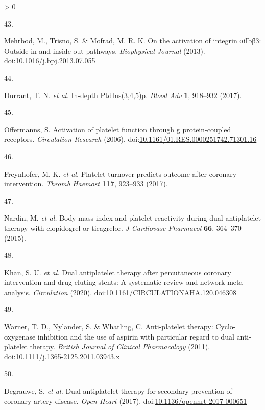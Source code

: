 \documentclass[11pt,twoside]{bristolthesis}
\newlength{\cslhangindent}
\newlength{\csllabelwidth}
\newenvironment{CSLReferences}[2] %
 {%
  \setlength{\parindent}{0pt}
  \ifodd #1 \everypar{\setlength{\hangindent}{\cslhangindent}}\ignorespaces\fi
  \ifnum #2 > 0
  \setlength{\parskip}{#2\baselineskip}
  \fi
 }%
 {}
\newcommand{\CSLLeftMargin}[1]{\parbox[t]{\csllabelwidth}{#1}}
\newcommand{\CSLRightInline}[1]{\parbox[t]{\linewidth - \csllabelwidth}{#1}\break}
\begin{document}
\begin{CSLReferences}{0}{0}
\leavevmode\hypertarget{ref-Mehrbod2013}{}%
\CSLLeftMargin{43. }
\CSLRightInline{Mehrbod, M., Trisno, S. \& Mofrad, M. R. K. On the activation of integrin αiIbβ3: Outside-in and inside-out pathways. \emph{Biophysical Journal} (2013). doi:\href{https://doi.org/10.1016/j.bpj.2013.07.055}{10.1016/j.bpj.2013.07.055}}

\leavevmode\hypertarget{ref-Durrant2017}{}%
\CSLLeftMargin{44. }
\CSLRightInline{Durrant, T. N. \emph{et al.} In-depth PtdIns(3,4,5)p. \emph{Blood Adv} \textbf{1}, 918--932 (2017).}

\leavevmode\hypertarget{ref-Offermanns2006}{}%
\CSLLeftMargin{45. }
\CSLRightInline{Offermanns, S. Activation of platelet function through g protein-coupled receptors. \emph{Circulation Research} (2006). doi:\href{https://doi.org/10.1161/01.RES.0000251742.71301.16}{10.1161/01.RES.0000251742.71301.16}}

\leavevmode\hypertarget{ref-Freynhofer2017a}{}%
\CSLLeftMargin{46. }
\CSLRightInline{Freynhofer, M. K. \emph{et al.} Platelet turnover predicts outcome after coronary intervention. \emph{Thromb Haemost} \textbf{117}, 923--933 (2017).}

\leavevmode\hypertarget{ref-Nardin2015}{}%
\CSLLeftMargin{47. }
\CSLRightInline{Nardin, M. \emph{et al.} Body mass index and platelet reactivity during dual antiplatelet therapy with clopidogrel or ticagrelor. \emph{J Cardiovasc Pharmacol} \textbf{66}, 364--370 (2015).}

\leavevmode\hypertarget{ref-Khan2020}{}%
\CSLLeftMargin{48. }
\CSLRightInline{Khan, S. U. \emph{et al.} Dual antiplatelet therapy after percutaneous coronary intervention and drug-eluting stents: A systematic review and network meta-analysis. \emph{Circulation} (2020). doi:\href{https://doi.org/10.1161/CIRCULATIONAHA.120.046308}{10.1161/CIRCULATIONAHA.120.046308}}

\leavevmode\hypertarget{ref-Warner2011}{}%
\CSLLeftMargin{49. }
\CSLRightInline{Warner, T. D., Nylander, S. \& Whatling, C. Anti-platelet therapy: Cyclo-oxygenase inhibition and the use of aspirin with particular regard to dual anti-platelet therapy. \emph{British Journal of Clinical Pharmacology} (2011). doi:\href{https://doi.org/10.1111/j.1365-2125.2011.03943.x}{10.1111/j.1365-2125.2011.03943.x}}

\leavevmode\hypertarget{ref-Degrauwe2017}{}%
\CSLLeftMargin{50. }
\CSLRightInline{Degrauwe, S. \emph{et al.} Dual antiplatelet therapy for secondary prevention of coronary artery disease. \emph{Open Heart} (2017). doi:\href{https://doi.org/10.1136/openhrt-2017-000651}{10.1136/openhrt-2017-000651}}


\end{CSLReferences}
\end{document}
